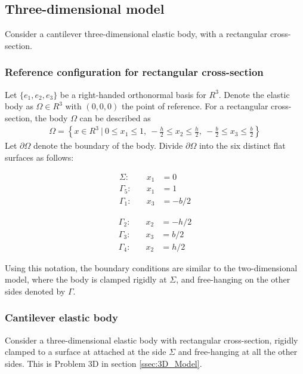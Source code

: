 \subsection{Three-dimensional model} \label{ssec:3D_Model:FEM}
Consider a cantilever three-dimensional elastic body, with a rectangular cross-section.
 
\subsubsection*{Reference configuration for rectangular cross-section}
Let $\{e_1,e_2,e_3\}$ be a right-handed orthonormal basis for $R^3$. Denote the elastic body as $\Omega \in R^3$ with $(0,0,0)$ the point of reference. For a rectangular cross-section, the body $\Omega$ can be described as
\begin{eqnarray*}
	\Omega = \left\{ x \in R^3 \ | \ 0 \leq x_1 \leq 1, \ -\frac{h}{2} \leq x_2 \leq \frac{h}{2} , \ -\frac{b}{2} \leq x_3 \leq \frac{b}{2}\right \}
\end{eqnarray*}
Let $\partial \Omega$ denote the boundary of the body. Divide $\partial \Omega$ into the six distinct flat surfaces as follows:

\noindent\begin{minipage}{.5\linewidth}
	\begin{eqnarray*}
		\Sigma:& \quad x_1 &= 0\\
		\Gamma_5:& \quad x_1 &= 1\\
		\Gamma_1:& \quad x_3 &= -{b}/{2} 
	\end{eqnarray*}
\end{minipage}%
\begin{minipage}{.5\linewidth}
	\begin{eqnarray*}
		\Gamma_2:& \quad x_2 &= -{h}/{2}\\
		\Gamma_3:& \quad x_3 &= {b}/{2}\\
		\Gamma_4:& \quad x_2 &= {h}/{2} 
	\end{eqnarray*}
\end{minipage}

Using this notation, the boundary conditions are similar to the two-dimensional model, where the body is clamped rigidly at $\Sigma$, and free-hanging on the other sides denoted by $\Gamma$.

\subsubsection{Cantilever elastic body}
Consider a three-dimensional elastic body with rectangular cross-section, rigidly clamped to a surface at attached at the side $\Sigma$ and free-hanging at all the other sides. This is Problem 3D in section \ref{ssec:3D_Model}.

